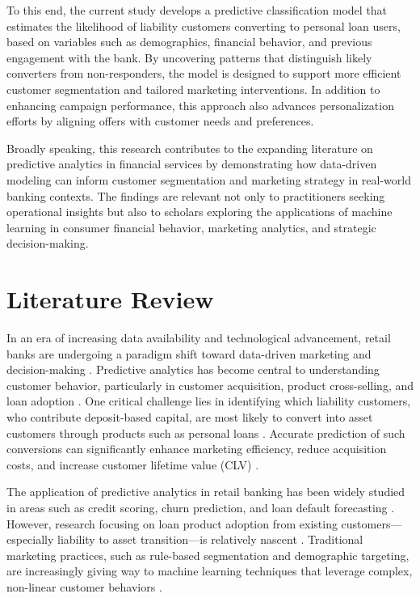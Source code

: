 \documentclass{article}
\begin{document}
To this end, the current study develops a predictive classification model that estimates the likelihood of liability customers converting to personal loan users, based on variables such as demographics, financial behavior, and previous engagement with the bank. By uncovering patterns that distinguish likely converters from non-responders, the model is designed to support more efficient customer segmentation and tailored marketing interventions. In addition to enhancing campaign performance, this approach also advances personalization efforts by aligning offers with customer needs and preferences.

Broadly speaking, this research contributes to the expanding literature on predictive analytics in financial services by demonstrating how data-driven modeling can inform customer segmentation and marketing strategy in real-world banking contexts. The findings are relevant not only to practitioners seeking operational insights but also to scholars exploring the applications of machine learning in consumer financial behavior, marketing analytics, and strategic decision-making.

\section{Literature Review}
In an era of increasing data availability and technological advancement, retail banks are undergoing a paradigm shift toward data-driven marketing and decision-making \citep{He2022ImpactStudy}. Predictive analytics has become central to understanding customer behavior, particularly in customer acquisition, product cross-selling, and loan adoption \citep{Boustani2024ImprovingNetworks}. One critical challenge lies in identifying which liability customers, who contribute deposit-based capital, are most likely to convert into asset customers through products such as personal loans \citep{Chang2024TowardsStudy}. Accurate prediction of such conversions can significantly enhance marketing efficiency, reduce acquisition costs, and increase customer lifetime value (CLV) \citep{Ulug2025OptimizedProgramming}.

The application of predictive analytics in retail banking has been widely studied in areas such as credit scoring, churn prediction, and loan default forecasting \citep{Singh2024InvestigatingManagement}. However, research focusing on loan product adoption from existing customers—especially liability to asset transition—is relatively nascent \citep{Vaduva2024ImprovingTechniques}. Traditional marketing practices, such as rule-based segmentation and demographic targeting, are increasingly giving way to machine learning techniques that leverage complex, non-linear customer behaviors \citep{deWaal2024ConsumersLearning}.
\end{document}
